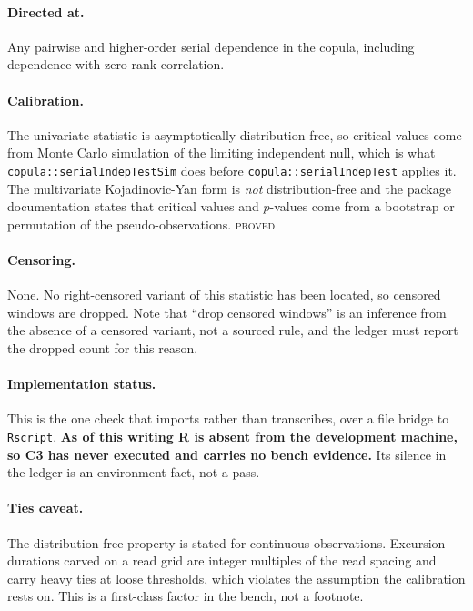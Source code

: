 \documentclass[11pt,a4paper]{article}
\newcommand{\PROVED}{\textsc{\textcolor{blue!55!black}{proved}}}
\begin{document}
\paragraph{Directed at.} Any pairwise and higher-order serial dependence in the copula,
including dependence with zero rank correlation.

\paragraph{Calibration.} The univariate statistic is asymptotically distribution-free,
so critical values come from Monte Carlo simulation of the limiting independent null,
which is what \texttt{copula::serialIndepTestSim} does before
\texttt{copula::serialIndepTest} applies it. The multivariate Kojadinovic-Yan form is
\emph{not} distribution-free and the package documentation states that critical values
and $p$-values come from a bootstrap or permutation of the pseudo-observations. \PROVED

\paragraph{Censoring.} None. No right-censored variant of this statistic has been
located, so censored windows are dropped. Note that \enquote{drop censored windows} is
an inference from the absence of a censored variant, not a sourced rule, and the ledger
must report the dropped count for this reason.

\paragraph{Implementation status.} This is the one check that imports rather than
transcribes, over a file bridge to \texttt{Rscript}. \textbf{As of this writing R is
absent from the development machine, so C3 has never executed and carries no bench
evidence.} Its silence in the ledger is an environment fact, not a pass.

\paragraph{Ties caveat.} The distribution-free property is stated for continuous
observations. Excursion durations carved on a read grid are integer multiples of the
read spacing and carry heavy ties at loose thresholds, which violates the assumption the
calibration rests on. This is a first-class factor in the bench, not a footnote.
\end{document}
